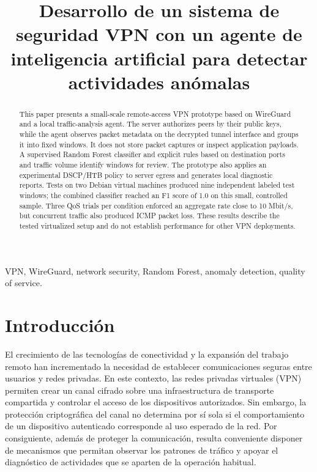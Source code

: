 \documentclass[conference]{IEEEtran}
\begin{document}
\title{Desarrollo de un sistema de seguridad VPN con un agente de inteligencia artificial para detectar actividades anómalas}
\author{
}

\maketitle

\begin{abstract}
This paper presents a small-scale remote-access VPN prototype based on WireGuard and a local traffic-analysis agent. The server authorizes peers by their public keys, while the agent observes packet metadata on the decrypted tunnel interface and groups it into fixed windows. It does not store packet captures or inspect application payloads. A supervised Random Forest classifier and explicit rules based on destination ports and traffic volume identify windows for review. The prototype also applies an experimental DSCP/HTB policy to server egress and generates local diagnostic reports. Tests on two Debian virtual machines produced nine independent labeled test windows; the combined classifier reached an F1 score of 1.0 on this small, controlled sample. Three QoS trials per condition enforced an aggregate rate close to 10 Mbit/s, but concurrent traffic also produced ICMP packet loss. These results describe the tested virtualized setup and do not establish performance for other VPN deployments.
\end{abstract}

\begin{IEEEkeywords}
VPN, WireGuard, network security, Random Forest, anomaly detection, quality of service.
\end{IEEEkeywords}

\section{Introducción}

El crecimiento de las tecnologías de conectividad y la expansión del trabajo remoto han incrementado la necesidad de establecer comunicaciones seguras entre usuarios y redes privadas. En este contexto, las redes privadas virtuales (VPN) permiten crear un canal cifrado sobre una infraestructura de transporte compartida y controlar el acceso de los dispositivos autorizados. Sin embargo, la protección criptográfica del canal no determina por sí sola si el comportamiento de un dispositivo autenticado corresponde al uso esperado de la red. Por consiguiente, además de proteger la comunicación, resulta conveniente disponer de mecanismos que permitan observar los patrones de tráfico y apoyar el diagnóstico de actividades que se aparten de la operación habitual.
\end{document}
